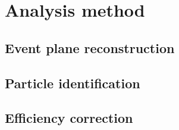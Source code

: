 
\section{Analysis method}


\subsection{Event plane reconstruction}


\subsection{Particle identification}


\subsection{Efficiency correction}
